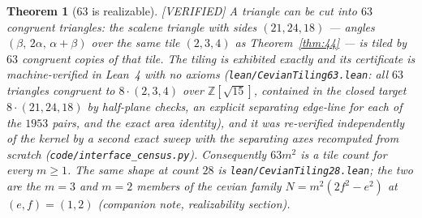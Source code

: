 \documentclass[11pt,reqno]{amsart}
\theoremstyle{plain}
\newtheorem{theorem}{Theorem}
\theoremstyle{definition}
\newcommand{\Z}{\mathbb{Z}}
\newcommand{\lab}[1]{\hfill\textnormal{\footnotesize\textsc{[#1]}}}
\begin{document}
\begin{theorem}[$63$ is realizable]\label{thm:63}\lab{VERIFIED}
A triangle can be cut into $63$ congruent triangles: the scalene triangle with sides $(21,24,18)$
--- angles $(\beta,\,2\alpha,\,\alpha{+}\beta)$ over the same tile $(2,3,4)$ as
Theorem~\ref{thm:44} --- is tiled by $63$ congruent copies of that tile. The tiling is exhibited
exactly and its certificate is machine-verified in Lean~4 with no axioms
(\texttt{lean/CevianTiling63.lean}: all $63$ triangles congruent to $8\cdot(2,3,4)$ over
$\Z[\sqrt{15}]$, contained in the closed target $8\cdot(21,24,18)$ by half-plane checks, an
explicit separating edge-line for each of the $1953$ pairs, and the exact area identity), and it
was re-verified independently of the kernel by a second exact sweep with the separating axes
recomputed from scratch (\texttt{code/interface\_census.py}). Consequently $63m^2$ is a tile
count for every $m\ge1$. The same shape at count $28$ is \texttt{lean/CevianTiling28.lean}; the
two are the $m=3$ and $m=2$ members of the cevian family $N=m^2(2f^2-e^2)$ at $(e,f)=(1,2)$
(companion note, realizability section).
\end{theorem}
\end{document}
